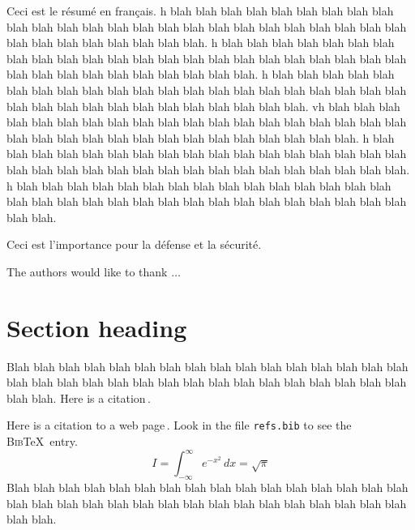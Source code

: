 \documentclass[pdfa]{drdc-report}
\begin{document}
\begin{fabstract}
  Ceci est le r\'esum\'e en fran\c{c}ais.
  h blah blah blah blah blah blah blah blah blah blah blah blah blah
blah blah blah blah blah blah blah blah blah blah blah blah blah blah
blah blah blah blah blah blah. 
h blah blah blah blah blah blah blah blah blah blah blah blah blah
blah blah blah blah blah blah blah blah blah blah blah blah blah blah
blah blah blah blah blah blah. 
h blah blah blah blah blah blah blah blah blah blah blah blah blah
blah blah blah blah blah blah blah blah blah blah blah blah blah blah
blah blah blah blah blah blah. vh blah blah blah blah blah blah blah blah blah blah blah blah blah
blah blah blah blah blah blah blah blah blah blah blah blah blah blah
blah blah blah blah blah blah. 
h blah blah blah blah blah blah blah blah blah blah blah blah blah
blah blah blah blah blah blah blah blah blah blah blah blah blah blah
blah blah blah blah blah blah. 
h blah blah blah blah blah blah blah blah blah blah blah blah blah
blah blah blah blah blah blah blah blah blah blah blah blah blah blah
blah blah blah blah blah blah. 
\end{fabstract}

\begin{fsignificance}
  Ceci est l'importance pour la d\'efense et la s\'ecurit\'e.
\end{fsignificance}

\tableofcontents\clearpage
\listoffigures\clearpage
\listoftables
\begin{acknowledgements}
The authors would like to thank $\ldots$
\end{acknowledgements}
\let\cleardoublepage\clearpage
\section{Section heading}

Blah blah blah blah blah blah blah blah blah blah blah blah blah blah
blah blah blah blah blah blah blah blah blah blah blah blah blah blah
blah blah blah blah blah blah.  Here is a citation\,\cite{EXAMPLE}.

Here is a citation to a web page\,\cite{MAPLE}.  Look in the file
\texttt{refs.bib} to see the \textsc{Bib}\TeX\ entry.
%
\begin{equation}
 I = \int_{-\infty}^\infty e^{-x^2}\,dx = \sqrt{\pi}
\end{equation}
%
Blah blah blah blah blah blah blah blah blah blah blah blah blah blah
blah blah blah blah blah blah blah blah blah blah blah blah blah blah
blah blah blah blah blah blah.
\end{document}

